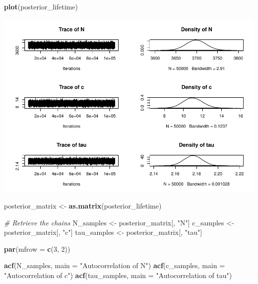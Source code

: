 \documentclass[
]{article}
\newenvironment{Shaded}{\begin{snugshade}}{\end{snugshade}}
\newcommand{\AttributeTok}[1]{\textcolor[rgb]{0.13,0.29,0.53}{#1}}
\newcommand{\CommentTok}[1]{\textcolor[rgb]{0.56,0.35,0.01}{\textit{#1}}}
\newcommand{\DecValTok}[1]{\textcolor[rgb]{0.00,0.00,0.81}{#1}}
\newcommand{\FunctionTok}[1]{\textcolor[rgb]{0.13,0.29,0.53}{\textbf{#1}}}
\newcommand{\NormalTok}[1]{#1}
\newcommand{\OtherTok}[1]{\textcolor[rgb]{0.56,0.35,0.01}{#1}}
\newcommand{\StringTok}[1]{\textcolor[rgb]{0.31,0.60,0.02}{#1}}
\begin{document}
\begin{Shaded}
\begin{Highlighting}[]
\FunctionTok{plot}\NormalTok{(posterior\_lifetime)}
\end{Highlighting}
\end{Shaded}

\includegraphics{BinnedAnalysis_files/figure-latex/unnamed-chunk-5-1.pdf}

\begin{Shaded}
\begin{Highlighting}[]
\NormalTok{posterior\_matrix }\OtherTok{\textless{}{-}} \FunctionTok{as.matrix}\NormalTok{(posterior\_lifetime)}

\CommentTok{\# Retrieve the chains}
\NormalTok{N\_samples   }\OtherTok{\textless{}{-}}\NormalTok{ posterior\_matrix[, }\StringTok{"N"}\NormalTok{]}
\NormalTok{c\_samples   }\OtherTok{\textless{}{-}}\NormalTok{ posterior\_matrix[, }\StringTok{"c"}\NormalTok{]}
\NormalTok{tau\_samples }\OtherTok{\textless{}{-}}\NormalTok{ posterior\_matrix[, }\StringTok{"tau"}\NormalTok{]}

\FunctionTok{par}\NormalTok{(}\AttributeTok{mfrow =} \FunctionTok{c}\NormalTok{(}\DecValTok{3}\NormalTok{, }\DecValTok{2}\NormalTok{))}

\FunctionTok{acf}\NormalTok{(N\_samples,  }\AttributeTok{main =} \StringTok{"Autocorrelation of N"}\NormalTok{)}
\FunctionTok{acf}\NormalTok{(c\_samples,   }\AttributeTok{main =} \StringTok{"Autocorrelation of c"}\NormalTok{)}
\FunctionTok{acf}\NormalTok{(tau\_samples, }\AttributeTok{main =} \StringTok{"Autocorrelation of tau"}\NormalTok{)}
\end{Highlighting}
\end{Shaded}
\end{document}
